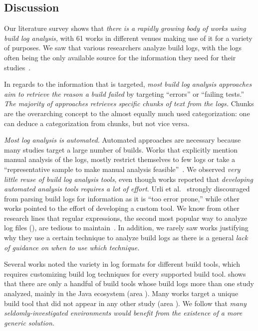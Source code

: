 \subsection{Discussion}
\label{sec:lit-sur:discussion}

Our literature survey shows that \emph{there is a rapidly growing body
of works using build log analysis,}
with 61 works in different venues making use of it for a variety of
purposes.
We saw that various researchers analyze build logs, with the
logs often being the only available source for the
information they need for their studies~\cite{ren2018automated,
seo2014programmers,beller2017oops,zampetti2017open,rausch2017empirical}.

In regards to the information that is targeted, \emph{most build log
analysis approaches aim to retrieve the reason a build failed} by
targeting ``errors'' or ``failing tests.''
\emph{The majority of approaches retrieves specific chunks of
text from the logs.} Chunks are the overarching concept to
the almost equally much used categorization: one can deduce a
categorization from chunks, but not vice versa.

\emph{Most log analysis is automated.} Automated approaches are
necessary because many studies target a large number of builds.
Works
that explicitly mention manual analysis of the logs, mostly
restrict themselves to few logs or take a ``representative sample to
make manual analysis feasible''~\cite{zolfagharinia2017not}.
We observed \emph{very little reuse of build log analysis tools},
even though works reported that
\emph{developing automated analysis tools requires a lot of effort}.
Urli et al.~\cite{urli2018design} strongly discouraged from parsing
build logs for information as it is ``too error prone,'' while other
works pointed to the effort of developing a custom tool.
We know from other research lines that regular expressions, the second
most popular way to analyze log files (),
are tedious to
maintain~\cite{michael2019regexes}.
In addition, we rarely saw works justifying why they use a certain
technique to analyze build logs as there is a general \emph{lack of
guidance on when to use which technique.}

Several works noted the variety in log formats for different build
tools, which requires customizing build log techniques for
every supported build tool.
 shows that there are only a handful of
build tools whose build logs more than one study analyzed, mainly in
the Java ecosystem (area ).
Many works target a unique build tool that did not appear in any other
study (area ).
We follow that \emph{many seldomly-investigated
environments would benefit from the
existence of a more generic solution.}

